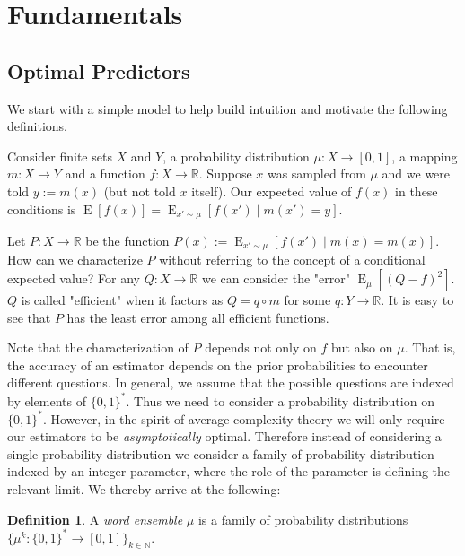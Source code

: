 \documentclass{article}
\numberwithin{equation}{section}
\theoremstyle{definition}
\newtheorem{definition}{Definition}[section]
\theoremstyle{plain}
\newcommand{\Words}{{\{ 0, 1 \}^*}}
\DeclareMathOperator{\E}{E}
\newcommand{\Nats}{\mathbb{N}}
\newcommand{\Reals}{\mathbb{R}}
\begin{document}
\section{Fundamentals}
\label{sec:fundamentals}

\subsection{Optimal Predictors}

We start with a simple model to help build intuition and motivate the following definitions.

Consider finite sets $X$ and $Y$, a probability distribution $\mu: X \rightarrow [0,1]$, a mapping $m: X \rightarrow Y$ and a function $f: X \rightarrow \Reals$. Suppose $x$ was sampled from $\mu$ and we were told $y := m(x)$ (but not told $x$ itself). Our expected value of $f(x)$ in these conditions is $\E[f(x)] = \E_{x' \sim \mu}[f(x') \mid m(x') = y]$.

Let $P: X \rightarrow \Reals$ be the function $P(x) := \E_{x' \sim \mu}[f(x') \mid m(x) = m(x)]$. How can we characterize $P$ without referring to the concept of a conditional expected value? For any $Q: X \rightarrow \Reals$ we can consider the "error" $\E_\mu[(Q - f)^2]$. $Q$ is called "efficient" when it factors as $Q = q \circ m$ for some $q: Y \rightarrow \Reals$. It is easy to see that $P$ has the least error among all efficient functions.

Note that the characterization of $P$ depends not only on $f$ but also on $\mu$. That is, the accuracy of an estimator depends on the prior probabilities to encounter different questions. In general, we assume that the possible questions are indexed by elements of $\Words$. Thus we need to consider a probability distribution on $\Words$. However, in the spirit of average-complexity theory we will only require our estimators to be \emph{asymptotically} optimal. Therefore instead of considering a single probability distribution we consider a family of probability distribution indexed by an integer parameter, where the role of the parameter is defining the relevant limit. We thereby arrive at the following:

\begin{definition}

A \emph{word ensemble} $\mu$ is a family of probability distributions $\{\mu^k: \Words \rightarrow [0,1]\}_{k \in \Nats}$.

\end{definition}
\end{document}
